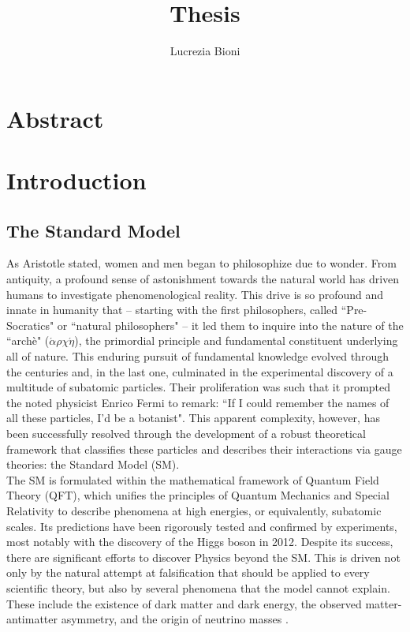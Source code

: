 \documentclass[a4paper, 12pt]{book}
\title{Thesis}
\author{Lucrezia Bioni}
\begin{document}
\frontmatter

\clearpage

\chapter*{Abstract}


\newpage

\toc

\pagestyle{contents}

\mainmatter


\chapter{Introduction}

\section{The Standard Model}


As Aristotle stated, women and men began to philosophize due to wonder. From antiquity, a profound sense of astonishment towards the natural world has driven humans to investigate phenomenological reality. This drive is so profound and innate in humanity that – starting with the first philosophers, called ``Pre-Socratics"  or ``natural philosophers" – it led them to inquire into the nature of the ``archè" ($\acute{\alpha}\rho\chi\acute{\eta}$), the primordial principle and fundamental constituent underlying all of nature. This enduring pursuit of fundamental knowledge evolved through the centuries and, in the last one, culminated in the experimental discovery of a multitude of subatomic particles. Their proliferation was such that it prompted the noted physicist Enrico Fermi to remark: ``If I could remember the names of all these particles, I'd be a botanist". This apparent complexity, however, has been successfully resolved through the development of a robust theoretical framework that classifies these particles and describes their interactions via gauge theories: the Standard Model (SM). \\
The SM is formulated within the mathematical framework of Quantum Field Theory (QFT), which unifies the principles of Quantum Mechanics and Special Relativity to describe phenomena at high energies, or equivalently, subatomic scales. Its predictions have been rigorously tested and confirmed by experiments, most notably with the discovery of the Higgs boson in 2012.  Despite its success, there are significant efforts to discover Physics beyond the SM. This is driven not only by the natural attempt at falsification that should be applied to every scientific theory, but also by several phenomena that the model cannot explain. These include the existence of dark matter and dark energy, the observed matter-antimatter asymmetry, and the origin of neutrino masses \cite{Campbell:2017}. \\
\end{document}
